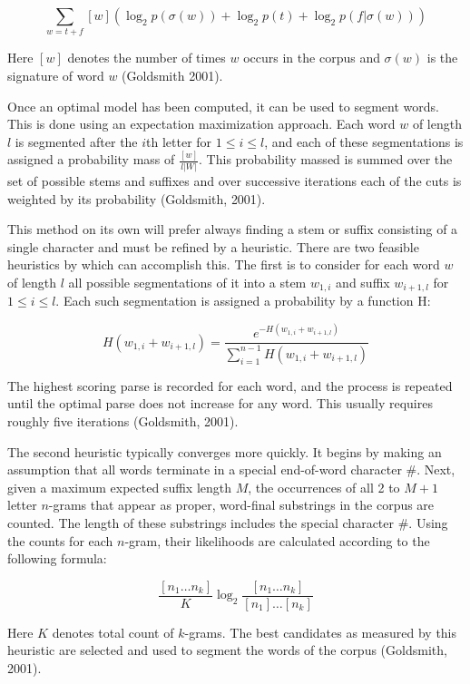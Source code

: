 \documentclass[12pt]{article}
\begin{document}
$$\sum_{w=t+f} [w] (\log_2 p(\sigma(w)) + \log_2 p(t) + \log_2 p (f \vert \sigma(w))) $$

\noindent Here $[w]$ denotes the number of times $w$ occurs in the corpus and $\sigma(w)$ is the signature of word $w$ (Goldsmith 2001).

Once an optimal model has been computed, it can be used to segment words. This is done using an expectation maximization approach. Each word $w$ of length $l$ is segmented after the $i$th letter for $1 \leq i \leq l$, and each of these segmentations is assigned a probability mass of $\frac{[w]}{l \vert W \vert}$. This probability massed is summed over the set of possible stems and suffixes and over successive iterations each of the cuts is weighted by its probability (Goldsmith, 2001).

This method on its own will prefer always finding a stem or suffix consisting of a single character and must be refined by a heuristic. There are two feasible heuristics by which can accomplish this. The first is to consider for each word $w$ of length $l$ all possible segmentations of it into a stem $w_{1,i}$ and suffix $w_{i+1,l}$ for $1 \leq i \leq l$. Each such segmentation is assigned a probability by a function H:

$$ H(w_{1,i} + w_{i+1,l}) = \frac{e^{-H(w_{1,i}+w_{i+1,l})}}{\sum_{i=1}^{n-1} H(w_{1,i} + w_{i+1,l})}$$

\noindent The highest scoring parse is recorded for each word, and the process is repeated until the optimal parse does not increase for any word. This usually requires roughly five iterations (Goldsmith, 2001).

The second heuristic typically converges more quickly. It begins by making an assumption that all words terminate in a special end-of-word character \#. Next, given a maximum expected suffix length $M$, the occurrences of all 2 to $M+1$ letter $n$-grams that appear as proper, word-final substrings in the corpus are counted. The length of these substrings includes the special character \#. Using the counts for each $n$-gram, their likelihoods are calculated according to the following formula:

$$\frac{[n_1 \dots n_k]}{K} \log_2 \frac{[n_1 \dots n_k]}{[n_1] \dots [n_k]}$$

\noindent Here $K$ denotes total count of $k$-grams. The best candidates as measured by this heuristic are selected and used to segment the words of the corpus (Goldsmith, 2001).
\end{document}
